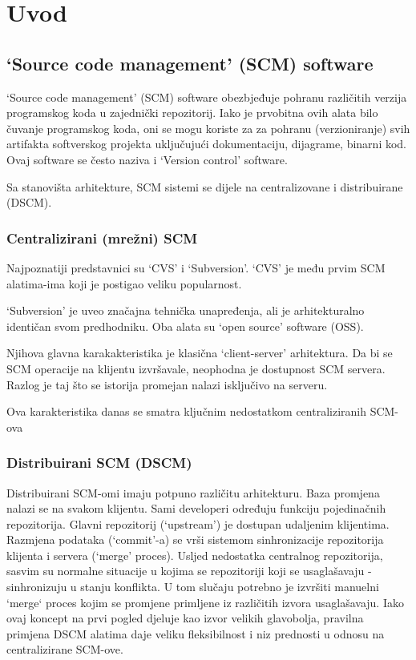 \documentclass[times, utf8, seminar]{fit}
\begin{document}

\chapter{Uvod}
\vspace*{-0.7cm}

\section{`Source code management' (SCM) software}

`Source code management' (SCM) software obezbjeđuje pohranu različitih verzija programskog koda u zajednički repozitorij. 
Iako je prvobitna ovih alata bilo čuvanje programskog koda, oni se mogu koriste za za pohranu (verzioniranje) svih artifakta softverskog projekta uključujući dokumentaciju, dijagrame, binarni kod.
Ovaj software se često naziva i `Version control' software.

Sa stanovišta arhitekture, SCM sistemi se dijele na centralizovane i distribuirane (DSCM).

\subsection{Centralizirani (mrežni) SCM}

Najpoznatiji predstavnici su `CVS' i `Subversion'. `CVS' je među prvim SCM alatima-ima koji je postigao veliku popularnost.

`Subversion' je uveo značajna tehnička unapređenja, ali je arhitekturalno identičan svom predhodniku. Oba alata su `open source' software (OSS).

Njihova glavna karakakteristika je klasična `client-server' arhitektura. Da bi se SCM operacije na klijentu izvršavale, neophodna je dostupnost SCM servera.
Razlog je taj što se istorija promejan nalazi isključivo na serveru.

Ova karakteristika danas se smatra ključnim nedostatkom centraliziranih SCM-ova

\subsection{Distribuirani SCM (DSCM)}

Distribuirani SCM-omi imaju potpuno različitu arhitekturu. Baza promjena nalazi se na svakom klijentu.
Sami developeri određuju funkciju pojedinačnih repozitorija. Glavni repozitorij (`upstream') je dostupan udaljenim klijentima.
Razmjena podataka (`commit'-a) se vrši sistemom sinhronizacije repozitorija klijenta i servera (`merge' proces). 
Usljed nedostatka centralnog repozitorija, sasvim su normalne situacije u kojima se repozitoriji koji se usaglašavaju - sinhronizuju u stanju konflikta.
U tom slučaju potrebno je izvršiti manuelni `merge` proces kojim se promjene primljene iz različitih izvora usaglašavaju.
Iako ovaj koncept na prvi pogled djeluje kao izvor velikih glavobolja, pravilna primjena DSCM alatima daje veliku fleksibilnost i niz prednosti u odnosu na centralizirane SCM-ove.
\end{document}

